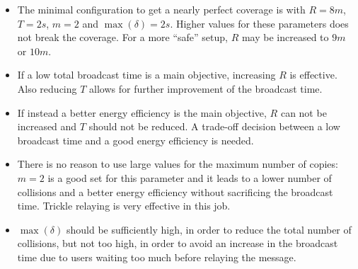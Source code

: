 \begin{itemize}
	\item The minimal configuration to get a nearly perfect coverage is with
		\(R\!=\!8m\), \(T\!=\!2s\), \(m\!=\!2\) and
		\(\max(\delta)\!=\!2s\). Higher values for these parameters does
		not break the coverage. For a more ``safe'' setup, \(R\) may be
		increased to \(9m\) or \(10m\).
	\item If a low total broadcast time is a main objective, increasing
		\(R\) is effective. Also reducing \(T\) allows for further
		improvement of the broadcast time.
	\item If instead a better energy efficiency is the main objective, \(R\)
		can not be increased and \(T\) should not be reduced. A
		trade-off decision between a low broadcast time and a good
		energy efficiency is needed.
	\item There is no reason to use large values for the maximum number of
		copies: \(m\!=\!2\) is a good set for this parameter and it
		leads to a lower number of collisions and a better energy
		efficiency without sacrificing the broadcast time. Trickle
		relaying is very effective in this job.
	\item \(\max(\delta)\) should be sufficiently high, in order to reduce
		the total number of collisions, but not too high, in order to
		avoid an increase in the broadcast time due to users waiting too
		much before relaying the message.
\end{itemize}
